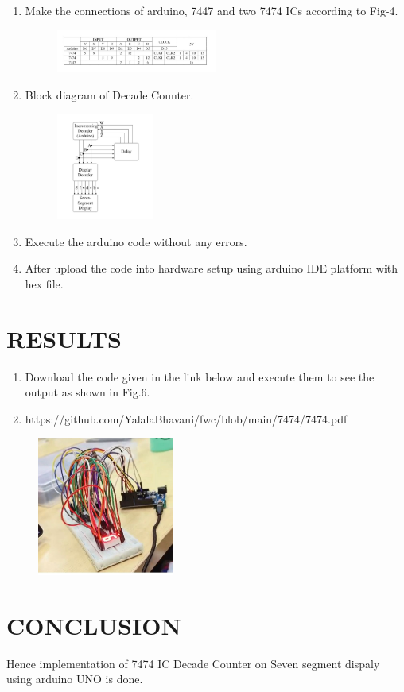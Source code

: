 \documentclass[conference]{IEEEtran}
\begin{document}
\begin{enumerate}

\item Make the connections of arduino, 7447 and two 7474 ICs according to Fig-4.
 \begin{figure}[h] 
 \centering 
 \includegraphics[width=0.5\textwidth]{5.jpg}
 \caption{\label{fig-4:Gates}}    
\end{figure}

\item Block diagram of Decade Counter.

\begin{figure}[h]                           
\centering                                 
\includegraphics[width=0.3\textwidth]{6.jpg}                                           
\caption{\label{fig-5:Gates}}               
\end{figure}


 
\item Execute the arduino code without any errors.
\item After upload the code into hardware setup using arduino IDE platform with hex file.
 \end{enumerate}

\section{RESULTS}
 \begin{enumerate}
  \item Download the code given in the link below and execute them to see the output as shown in Fig.6. 
  \item https://github.com/YalalaBhavani/fwc/blob/main/7474/7474.pdf
 \end{enumerate}
   \begin{figure}[h] 
 \centering 
 \includegraphics[width=0.4\textwidth]{7.jpg    }
 \caption{\label{fig-6:Gates}}    
\end{figure}
\section{CONCLUSION}
Hence implementation of 7474 IC Decade Counter on Seven segment dispaly using arduino UNO is done.
\end{document}
